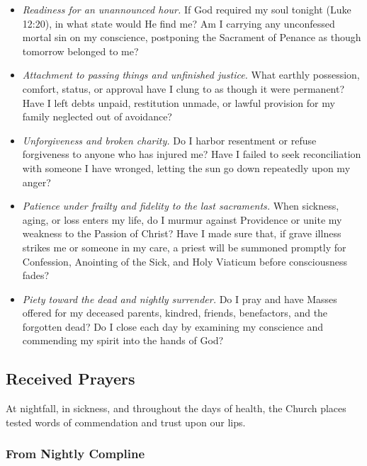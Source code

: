 \begin{itemize}
\item \textit{Readiness for an unannounced hour.} If God required my soul tonight (Luke 12:20), in what state would He find me? Am I carrying any unconfessed mortal sin on my conscience, postponing the Sacrament of Penance as though tomorrow belonged to me?
\item \textit{Attachment to passing things and unfinished justice.} What earthly possession, comfort, status, or approval have I clung to as though it were permanent? Have I left debts unpaid, restitution unmade, or lawful provision for my family neglected out of avoidance?
\item \textit{Unforgiveness and broken charity.} Do I harbor resentment or refuse forgiveness to anyone who has injured me? Have I failed to seek reconciliation with someone I have wronged, letting the sun go down repeatedly upon my anger?
\item \textit{Patience under frailty and fidelity to the last sacraments.} When sickness, aging, or loss enters my life, do I murmur against Providence or unite my weakness to the Passion of Christ? Have I made sure that, if grave illness strikes me or someone in my care, a priest will be summoned promptly for Confession, Anointing of the Sick, and Holy Viaticum before consciousness fades?
\item \textit{Piety toward the dead and nightly surrender.} Do I pray and have Masses offered for my deceased parents, kindred, friends, benefactors, and the forgotten dead? Do I close each day by examining my conscience and commending my spirit into the hands of God?
\end{itemize}

\subsection*{Received Prayers}

At nightfall, in sickness, and throughout the days of health, the Church places tested words of commendation and trust upon our lips.

\subsubsection*{From Nightly Compline}

